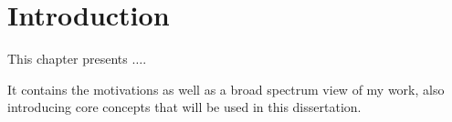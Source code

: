 \chapter{Introduction}

This chapter presents $\ldots$.

It contains the motivations as well as a broad spectrum view of my work, also introducing core concepts that will be used in this dissertation.




